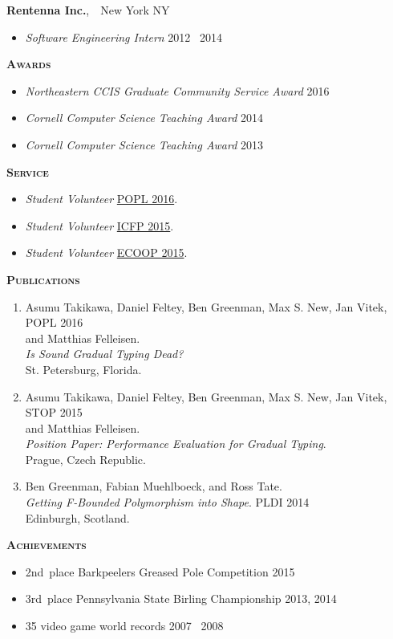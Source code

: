 \documentclass{article}
\newcommand{\mysection}[1]{\vspace{0.5cm}
\hspace{-1.3cm}\textsc{\textbf{#1}}~\hrulefill}
\newcommand{\mysubsection}[1]{\hspace{-0.7cm}\textbf{#1}}
\begin{document}
\mysubsection{Rentenna Inc.},~~New York NY
\begin{itemize}
\item \emph{Software Engineering Intern} \hfill 2012 \textendash\ 2014
\end{itemize}

\newpage
\mysection{Awards} %
\begin{itemize}
\item \emph{Northeastern CCIS Graduate Community Service Award} \hfill 2016
\item \emph{Cornell Computer Science Teaching Award} \hfill 2014
\item \emph{Cornell Computer Science Teaching Award} \hfill 2013
\end{itemize}



\mysection{Service}
\begin{itemize}
\item \emph{Student Volunteer} \hfill \href{http://conf.researchr.org/home/POPL-2016}{POPL 2016}.
\item \emph{Student Volunteer} \hfill \href{http://icfpconference.org/icfp2015/}{ICFP 2015}.
\item \emph{Student Volunteer} \hfill \href{http://2015.ecoop.org/}{ECOOP 2015}.
\end{itemize}


\mysection{Publications}

\begin{enumerate}
\item
  Asumu Takikawa, Daniel Feltey, Ben Greenman, Max S. New, Jan Vitek, \hfill POPL 2016 \\
   and Matthias Felleisen. \\
   \emph{Is Sound Gradual Typing Dead?} \\
  St. Petersburg, Florida.
\item
  Asumu Takikawa, Daniel Feltey, Ben Greenman, Max S. New, Jan Vitek, \hfill STOP 2015 \\
   and Matthias Felleisen. \\
   \emph{Position Paper: Performance Evaluation for Gradual Typing}. \\
  Prague, Czech Republic.
\item
  Ben Greenman, Fabian Muehlboeck, and Ross Tate. \\
  \emph{Getting F-Bounded Polymorphism into Shape}. \hfill PLDI 2014 \\
  Edinburgh, Scotland.
\end{enumerate}


\mysection{Achievements}

\begin{itemize}
\item 2nd~place Barkpeelers Greased Pole Competition \hfill 2015
\item 3rd~place Pennsylvania State Birling Championship \hfill 2013, 2014
\item 35 video game world records \hfill 2007 \textendash\ 2008
\end{itemize}
\end{document}
